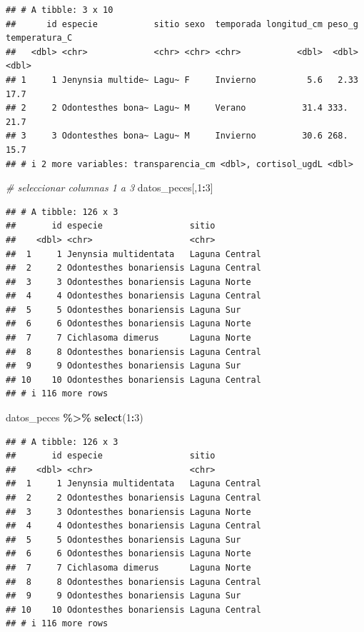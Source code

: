 \documentclass[
]{article}
\newenvironment{Shaded}{\begin{snugshade}}{\end{snugshade}}
\newcommand{\CommentTok}[1]{\textcolor[rgb]{0.56,0.35,0.01}{\textit{#1}}}
\newcommand{\DecValTok}[1]{\textcolor[rgb]{0.00,0.00,0.81}{#1}}
\newcommand{\FunctionTok}[1]{\textcolor[rgb]{0.13,0.29,0.53}{\textbf{#1}}}
\newcommand{\NormalTok}[1]{#1}
\newcommand{\SpecialCharTok}[1]{\textcolor[rgb]{0.81,0.36,0.00}{\textbf{#1}}}
\begin{document}
\begin{verbatim}
## # A tibble: 3 x 10
##      id especie           sitio sexo  temporada longitud_cm peso_g temperatura_C
##   <dbl> <chr>             <chr> <chr> <chr>           <dbl>  <dbl>         <dbl>
## 1     1 Jenynsia multide~ Lagu~ F     Invierno          5.6   2.33          17.7
## 2     2 Odontesthes bona~ Lagu~ M     Verano           31.4 333.            21.7
## 3     3 Odontesthes bona~ Lagu~ M     Invierno         30.6 268.            15.7
## # i 2 more variables: transparencia_cm <dbl>, cortisol_ugdL <dbl>
\end{verbatim}

\begin{Shaded}
\begin{Highlighting}[]
\CommentTok{\# seleccionar columnas 1 a 3}
\NormalTok{datos\_peces[,}\DecValTok{1}\SpecialCharTok{:}\DecValTok{3}\NormalTok{]}
\end{Highlighting}
\end{Shaded}

\begin{verbatim}
## # A tibble: 126 x 3
##       id especie                 sitio         
##    <dbl> <chr>                   <chr>         
##  1     1 Jenynsia multidentata   Laguna Central
##  2     2 Odontesthes bonariensis Laguna Central
##  3     3 Odontesthes bonariensis Laguna Norte  
##  4     4 Odontesthes bonariensis Laguna Central
##  5     5 Odontesthes bonariensis Laguna Sur    
##  6     6 Odontesthes bonariensis Laguna Norte  
##  7     7 Cichlasoma dimerus      Laguna Norte  
##  8     8 Odontesthes bonariensis Laguna Central
##  9     9 Odontesthes bonariensis Laguna Sur    
## 10    10 Odontesthes bonariensis Laguna Central
## # i 116 more rows
\end{verbatim}

\begin{Shaded}
\begin{Highlighting}[]
\NormalTok{datos\_peces }\SpecialCharTok{\%\textgreater{}\%} \FunctionTok{select}\NormalTok{(}\DecValTok{1}\SpecialCharTok{:}\DecValTok{3}\NormalTok{)}
\end{Highlighting}
\end{Shaded}

\begin{verbatim}
## # A tibble: 126 x 3
##       id especie                 sitio         
##    <dbl> <chr>                   <chr>         
##  1     1 Jenynsia multidentata   Laguna Central
##  2     2 Odontesthes bonariensis Laguna Central
##  3     3 Odontesthes bonariensis Laguna Norte  
##  4     4 Odontesthes bonariensis Laguna Central
##  5     5 Odontesthes bonariensis Laguna Sur    
##  6     6 Odontesthes bonariensis Laguna Norte  
##  7     7 Cichlasoma dimerus      Laguna Norte  
##  8     8 Odontesthes bonariensis Laguna Central
##  9     9 Odontesthes bonariensis Laguna Sur    
## 10    10 Odontesthes bonariensis Laguna Central
## # i 116 more rows
\end{verbatim}
\end{document}
